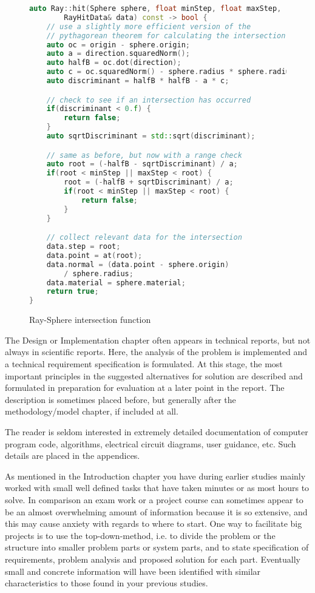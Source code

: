 \begin{figure}[H]
	\begin{center}
		\begin{lstlisting}[language=C++]
auto Ray::hit(Sphere sphere, float minStep, float maxStep, 
		RayHitData& data) const -> bool {
	// use a slightly more efficient version of the 
	// pythagorean theorem for calculating the intersection
	auto oc = origin - sphere.origin;
	auto a = direction.squaredNorm();
	auto halfB = oc.dot(direction);
	auto c = oc.squaredNorm() - sphere.radius * sphere.radius;
	auto discriminant = halfB * halfB - a * c;

	// check to see if an intersection has occurred
	if(discriminant < 0.f) {
		return false;
	}
	auto sqrtDiscriminant = std::sqrt(discriminant);

	// same as before, but now with a range check
	auto root = (-halfB - sqrtDiscriminant) / a;
	if(root < minStep || maxStep < root) {
		root = (-halfB + sqrtDiscriminant) / a;
		if(root < minStep || maxStep < root) {
			return false;
		}
	}

	// collect relevant data for the intersection
	data.step = root;
	data.point = at(root);
	data.normal = (data.point - sphere.origin) 
		/ sphere.radius;
	data.material = sphere.material;
	return true;
}
		\end{lstlisting}
		\caption{Ray-Sphere intersection function}
		\label{intersect-code}
	\end{center}
\end{figure}

\iffalse
The Design or Implementation chapter often appears in technical reports, but not always in scientific reports. Here, the analysis of the problem is implemented and a technical requirement specification is formulated. At this stage, the most important principles in the suggested alternatives for solution are described and formulated in preparation for evaluation at a later point in the report. The description is sometimes placed before, but generally after the methodology/model chapter, if included at all.

The reader is seldom interested in extremely detailed documentation of computer program code, algorithms, electrical circuit diagrams, user guidance, etc. Such details are placed in the appendices.

As mentioned in the Introduction chapter you have during earlier studies mainly worked with small well defined tasks that have taken minutes or as most hours to solve. In comparison an exam work or a project course can sometimes appear to be an almost overwhelming amount of information because it is so extensive, and this may cause anxiety with regards to where to start. One way to facilitate big projects is to use the top-down-method, i.e. to divide the problem or the structure into smaller problem parts or system parts, and to state specification of  requirements, problem analysis and proposed solution for each part. Eventually small and concrete information will have been identified with similar characteristics to those found in your previous studies.

